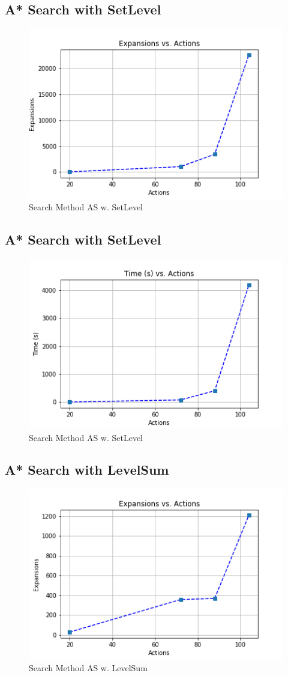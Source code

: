 \documentclass[a4paper]{article}
\begin{document}
\subsection{A* Search with SetLevel}

\begin{figure}[htpb]
\begin{center}
\includegraphics[width=0.5\columnwidth]{fig/results_634.png}
\caption{Search Method AS w. SetLevel}
\end{center}
\label{fig634}
\end{figure}
        

\subsection{A* Search with SetLevel}

\begin{figure}[htpb]
\begin{center}
\includegraphics[width=0.5\columnwidth]{fig/results_631.png}
\caption{Search Method AS w. SetLevel}
\end{center}
\label{fig631}
\end{figure}
        

\subsection{A* Search with LevelSum}

\begin{figure}[htpb]
\begin{center}
\includegraphics[width=0.5\columnwidth]{fig/results_734.png}
\caption{Search Method AS w. LevelSum}
\end{center}
\label{fig734}
\end{figure}
        
\end{document}
